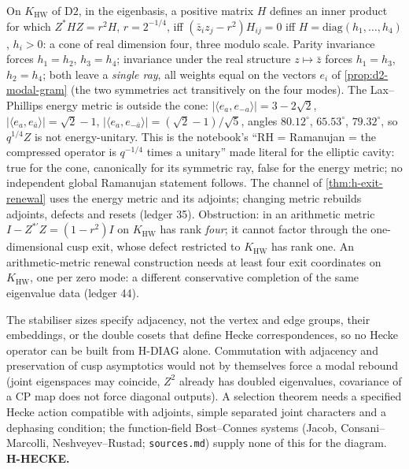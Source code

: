 \begin{theorem}
\label{thm:arithmetic-metric}
On $K_{\mathrm{HW}}$ of $\mathrm{D2}$, in the eigenbasis, a positive matrix $H$ defines an inner product for which
$Z^{*}HZ = r^2H$, $r = 2^{-1/4}$, iff $(\bar z_iz_j-r^2)H_{ij} = 0$ iff $H = \mathrm{diag}(h_1,\dots,h_4)$, $h_i>0$: a
cone of real dimension four, three modulo scale. Parity invariance forces $h_1 = h_2$, $h_3 = h_4$; invariance under
the real structure $z\mapsto\bar z$ forces $h_1 = h_3$, $h_2 = h_4$; both leave a \emph{single ray}, all weights
equal on the vectors $e_i$ of \cref{prop:d2-modal-gram} (the two symmetries act transitively on the four modes).
The Lax--Phillips energy metric is outside the cone: $|\langle e_a,e_{-a}\rangle| = 3-2\sqrt2$,
$|\langle e_a,e_{\bar a}\rangle| = \sqrt2-1$, $|\langle e_a,e_{-\bar a}\rangle| = (\sqrt2-1)/\sqrt5$, angles
$80.12^\circ$, $65.53^\circ$, $79.32^\circ$, so $q^{1/4}Z$ is not energy-unitary. This is the notebook's ``RH =
Ramanujan = the compressed operator is $q^{-1/4}$ times a unitary'' made literal for the elliptic cavity: true for
the cone, canonically for its symmetric ray, false for the energy metric; no independent global Ramanujan
statement follows. The channel of \cref{thm:h-exit-renewal} uses the energy metric and its adjoints; changing
metric rebuilds adjoints, defects and resets (ledger 35). Obstruction: in an arithmetic metric
$I-Z^{*'}Z = (1-r^2)I$ on $K_{\mathrm{HW}}$ has rank \emph{four}; it cannot factor through the one-dimensional cusp
exit, whose defect restricted to $K_{\mathrm{HW}}$ has rank one. An arithmetic-metric renewal construction needs at
least four exit coordinates on $K_{\mathrm{HW}}$, one per zero mode: a different conservative completion of the same
eigenvalue data (ledger 44).
\end{theorem}

\begin{observation}
\label{obs:hecke-rebound-open}
The stabiliser sizes specify adjacency, not the vertex and edge groups, their embeddings, or the double cosets
that define Hecke correspondences, so no Hecke operator can be built from H-DIAG alone. Commutation with
adjacency and preservation of cusp asymptotics would not by themselves force a modal rebound (joint eigenspaces
may coincide, $Z^2$ already has doubled eigenvalues, covariance of a CP map does not force diagonal outputs). A
selection theorem needs a specified Hecke action compatible with adjoints, simple separated joint characters and
a dephasing condition; the function-field Bost--Connes systems (Jacob, Consani--Marcolli, Neshveyev--Rustad;
\texttt{sources.md}) supply none of this for the diagram. \textbf{H-HECKE.}
\end{observation}

